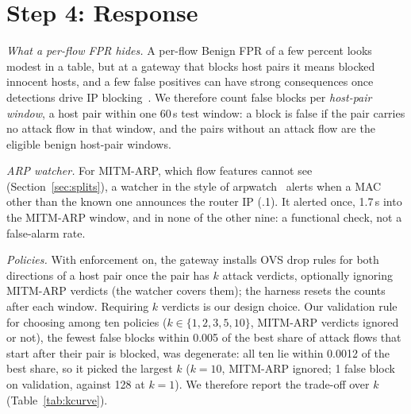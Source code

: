 \section{Step 4: Response}\label{sec:response}

\emph{What a per-flow FPR hides.} A per-flow Benign FPR of a few percent looks modest in a table, but at a gateway that blocks host pairs it means blocked innocent hosts, and a few false positives can have strong consequences once detections drive IP blocking~\cite{garcia2023labeling,akbari2020atmos}. We therefore count false blocks per \emph{host-pair window}, a host pair within one 60\,s test window: a block is false if the pair carries no attack flow in that window, and the pairs without an attack flow are the eligible benign host-pair windows.

\emph{ARP watcher.} For MITM-ARP, which flow features cannot see (Section~\ref{sec:splits}), a watcher in the style of arpwatch~\cite{arpwatch} alerts when a MAC other than the known one announces the router IP (.1). It alerted once, 1.7\,s into the MITM-ARP window, and in none of the other nine: a functional check, not a false-alarm rate.

\emph{Policies.} With enforcement on, the gateway installs OVS drop rules for both directions of a host pair once the pair has $k$ attack verdicts, optionally ignoring MITM-ARP verdicts (the watcher covers them); the harness resets the counts after each window. Requiring $k$ verdicts is our design choice. Our validation rule for choosing among ten policies ($k\in\{1,2,3,5,10\}$, MITM-ARP verdicts ignored or not), the fewest false blocks within 0.005 of the best share of attack flows that start after their pair is blocked, was degenerate: all ten lie within 0.0012 of the best share, so it picked the largest $k$ ($k=10$, MITM-ARP ignored; 1 false block on validation, against 128 at $k=1$). We therefore report the trade-off over $k$ (Table~\ref{tab:kcurve}).

